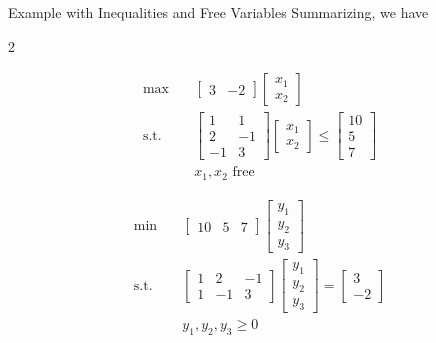 \begin{example}{Example with Inequalities and Free Variables}{}
Summarizing, we have

\begin{multicols}{2}
\begin{tcolorbox}[title=Primal (P), colback=blue!5, colframe=blue!60!black, sharp corners=south]
\[
\begin{aligned}
\max \quad &
\begin{bmatrix} 3 & -2 \end{bmatrix}
\begin{bmatrix} x_1 \\ x_2 \end{bmatrix} \\[0.5em]
\text{s.t.} \quad &
\begin{bmatrix}
1 & 1 \\
2 & -1 \\
-1 & 3
\end{bmatrix}
\begin{bmatrix} x_1 \\ x_2 \end{bmatrix}
\leq
\begin{bmatrix} 10 \\ 5 \\ 7 \end{bmatrix} \\[0.5em]
& x_1, x_2 \text{ free}
\end{aligned}
\]
\end{tcolorbox}

\columnbreak

\begin{tcolorbox}[title=Dual (D), colback=green!5, colframe=green!60!black, sharp corners=south]
\[
\begin{aligned}
\min \quad &
\begin{bmatrix} 10 & 5 & 7 \end{bmatrix}
\begin{bmatrix} y_1 \\ y_2 \\ y_3 \end{bmatrix} \\[0.5em]
\text{s.t.} \quad &
\begin{bmatrix}
1 & 2 & -1 \\
1 & -1 & 3
\end{bmatrix}
\begin{bmatrix} y_1 \\ y_2 \\ y_3 \end{bmatrix}
=
\begin{bmatrix} 3 \\ -2 \end{bmatrix} \\[0.5em]
& y_1, y_2, y_3 \geq 0
\end{aligned}
\]
\end{tcolorbox}
\end{multicols}


\end{example}
